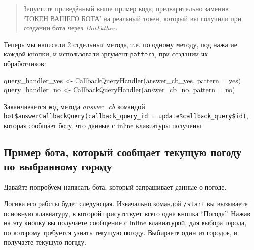 \documentclass[
]{book}
\newenvironment{Shaded}{\begin{snugshade}}{\end{snugshade}}
\newcommand{\AttributeTok}[1]{\textcolor[rgb]{0.77,0.63,0.00}{#1}}
\newcommand{\FunctionTok}[1]{\textcolor[rgb]{0.00,0.00,0.00}{#1}}
\newcommand{\NormalTok}[1]{#1}
\newcommand{\OtherTok}[1]{\textcolor[rgb]{0.56,0.35,0.01}{#1}}
\newcommand{\StringTok}[1]{\textcolor[rgb]{0.31,0.60,0.02}{#1}}
\begin{document}
\begin{quote}
Запустите приведённый выше пример кода, предварительно заменив `ТОКЕН ВАШЕГО БОТА' на реальный токен, который вы получили при создании бота через \emph{BotFather}.
\end{quote}

Теперь мы написали 2 отдельных метода, т.е. по одному методу, под нажатие каждой кнопки, и использовали аргумент \texttt{pattern}, при создании их обработчиков:

\begin{Shaded}
\begin{Highlighting}[]
\NormalTok{query\_handler\_yes }\OtherTok{\textless{}{-}} \FunctionTok{CallbackQueryHandler}\NormalTok{(answer\_cb\_yes, }\AttributeTok{pattern =} \StringTok{\textquotesingle{}yes\textquotesingle{}}\NormalTok{)}
\NormalTok{query\_handler\_no  }\OtherTok{\textless{}{-}} \FunctionTok{CallbackQueryHandler}\NormalTok{(answer\_cb\_no, }\AttributeTok{pattern =} \StringTok{\textquotesingle{}no\textquotesingle{}}\NormalTok{)}
\end{Highlighting}
\end{Shaded}

Заканчивается код метода \emph{answer\_cb} командой \texttt{bot\$answerCallbackQuery(callback\_query\_id\ =\ update\$callback\_query\$id)}, которая сообщает боту, что данные с inline клавиатуры получены.

\hypertarget{ux43fux440ux438ux43cux435ux440-ux431ux43eux442ux430-ux43aux43eux442ux43eux440ux44bux439-ux441ux43eux43eux431ux449ux430ux435ux442-ux442ux435ux43aux443ux449ux443ux44e-ux43fux43eux433ux43eux434ux443-ux43fux43e-ux432ux44bux431ux440ux430ux43dux43dux43eux43cux443-ux433ux43eux440ux43eux434ux443}{%
\subsection{Пример бота, который сообщает текущую погоду по выбранному городу}\label{ux43fux440ux438ux43cux435ux440-ux431ux43eux442ux430-ux43aux43eux442ux43eux440ux44bux439-ux441ux43eux43eux431ux449ux430ux435ux442-ux442ux435ux43aux443ux449ux443ux44e-ux43fux43eux433ux43eux434ux443-ux43fux43e-ux432ux44bux431ux440ux430ux43dux43dux43eux43cux443-ux433ux43eux440ux43eux434ux443}}

Давайте попробуем написать бота, который запрашивает данные о погоде.

Логика его работы будет следующая. Изначально командой \texttt{/start} вы вызываете основную клавиатуру, в которой присутствует всего одна кнопка ``Погода''. Нажав на эту кнопку вы получаете сообщение с Inline клавиатурой, для выбора города, по которому требуется узнать текущую погоду. Выбираете один из городов, и получаете текущую погоду.
\end{document}
